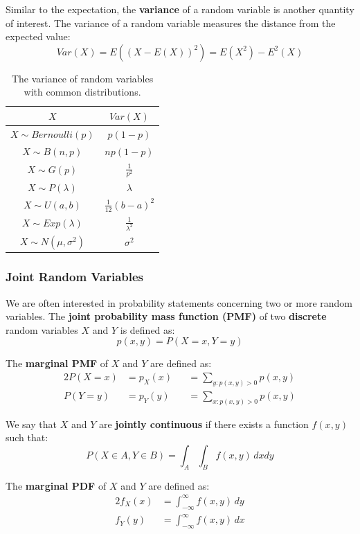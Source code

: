 \documentclass[12pt]{article}
\begin{document}
\noindent
Similar to the expectation, the \textbf{variance} of a random variable is another quantity of interest.
The variance of a random variable measures the distance from the expected value:
\[ Var(X) = E((X - E(X))^2) = E(X^2) - E^2(X) \]

\begin{table}[h]
    \centering
    \begin{tabular}{c|c}
    $X$                       & $Var(X)$               \\ \hline
    $X \sim Bernoulli(p)$     & $p(1 - p)$                  \\
    $X \sim B(n, p)$          & $np(1 - p)$                 \\
    $X \sim G(p)$             & $\frac{1}{p^2}$        \\
    $X \sim P(\lambda)$       & $\lambda$            \\
    $X \sim U(a, b)$          & $\frac{1}{12}(b - a)^2$ \\
    $X \sim Exp(\lambda)$     & $\frac{1}{\lambda^2}$  \\
    $X \sim N(\mu, \sigma^2)$ & $\sigma^2$               
    \end{tabular}
    \caption{The variance of random variables with common distributions.}
\end{table}

\subsubsection{Joint Random Variables}
We are often interested in probability statements concerning two or more random variables.
The \textbf{joint probability mass function (PMF)} of two \textbf{discrete} random variables $X$ and $Y$ is defined as:
\[ p(x, y) = P(X = x, Y = y) \]

\noindent
The \textbf{marginal PMF} of $X$ and $Y$ are defined as:
\begin{alignat*}{2}
    P(X = x) &= p_X(x) & &= \sum_{y:p(x, y) > 0} p(x, y) \\
    P(Y = y) &= p_Y(y) & &= \sum_{x:p(x, y) > 0} p(x, y)
\end{alignat*}

\noindent
We say that $X$ and $Y$ are \textbf{jointly continuous} if there exists a function $f(x, y)$ such that:
\[ P(X \in A, Y \in B) = \int_A \int_B f(x, y) \,dxdy \]

\newpage
\noindent
The \textbf{marginal PDF} of $X$ and $Y$ are defined as:
\begin{alignat*}{2}
    f_X(x) &= \int_{-\infty}^{\infty} f(x, y) \,dy \\
    f_Y(y) &= \int_{-\infty}^{\infty} f(x, y) \,dx
\end{alignat*}
\end{document}
